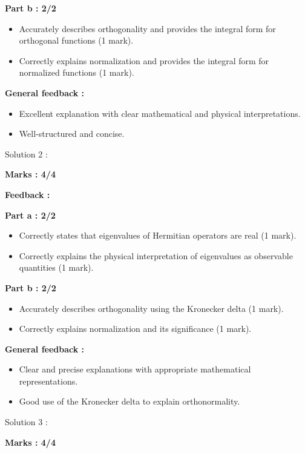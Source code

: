 \documentclass[a4paper,11pt]{article}
\begin{document}
\textbf{Part b : 2/2}

\begin{itemize}
    \item Accurately describes orthogonality and provides the integral form for orthogonal functions (1 mark).
    \item Correctly explains normalization and provides the integral form for normalized functions (1 mark).
\end{itemize}


\textbf{General feedback :}

\begin{itemize}
    \item Excellent explanation with clear mathematical and physical interpretations.
    \item Well-structured and concise.
\end{itemize}


Solution 2 : 

\textbf{Marks : 4/4}

\textbf{Feedback : }

\textbf{Part a : 2/2}

\begin{itemize}
    \item Correctly states that eigenvalues of Hermitian operators are real (1 mark).
    \item Correctly explains the physical interpretation of eigenvalues as observable quantities (1 mark).
\end{itemize}


\textbf{Part b : 2/2}

\begin{itemize}
    \item Accurately describes orthogonality using the Kronecker delta (1 mark).
    \item Correctly explains normalization and its significance (1 mark).
\end{itemize}


\textbf{General feedback :}

\begin{itemize}
    \item Clear and precise explanations with appropriate mathematical representations.
    \item Good use of the Kronecker delta to explain orthonormality.
\end{itemize}


Solution 3 : 

\textbf{Marks : 4/4}
\end{document}
